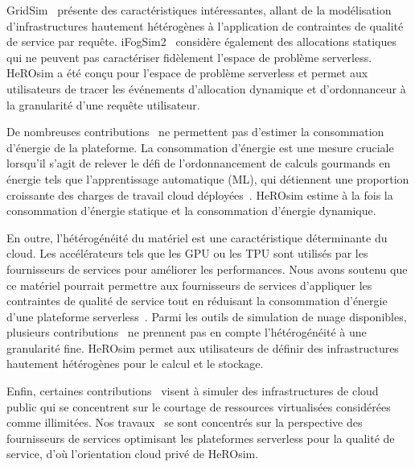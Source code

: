 GridSim~\cite{buyyaGridSimToolkitModeling2002} présente des caractéristiques intéressantes, allant de la modélisation d'infrastructures hautement hétérogènes à l'application de contraintes de qualité de service par requête. iFogSim2~\cite{mahmudIFogSim2ExtendedIFogSim2021} considère également des allocations statiques qui ne peuvent pas caractériser fidèlement l'espace de problème serverless. HeROsim a été conçu pour l'espace de problème serverless et permet aux utilisateurs de tracer les événements d'allocation dynamique et d'ordonnanceur à la granularité d'une requête utilisateur.

De nombreuses contributions~\cite{jeonCloudSimExtensionSimulatingDistributed2019, cai_elasticsim_2017, buyyaGridSimToolkitModeling2002, nunez_icancloud_2012} ne permettent pas d'estimer la consommation d'énergie de la plateforme. La consommation d'énergie est une mesure cruciale lorsqu'il s'agit de relever le défi de l'ordonnancement de calculs gourmands en énergie tels que l'apprentissage automatique (ML), qui détiennent une proportion croissante des charges de travail cloud déployées~\cite{masanet2020recalibrating}. 
HeROsim estime à la fois la consommation d'énergie statique et la consommation d'énergie dynamique.

En outre, l'hétérogénéité du matériel est une caractéristique déterminante du cloud. Les accélérateurs tels que les GPU ou les TPU sont utilisés par les fournisseurs de services pour améliorer les performances. Nous avons soutenu que ce matériel pourrait permettre aux fournisseurs de services d'appliquer les contraintes de qualité de service tout en réduisant la consommation d'énergie d'une plateforme serverless~\cite{herofake}.
Parmi les outils de simulation de nuage disponibles, plusieurs contributions~\cite{jeonCloudSimExtensionSimulatingDistributed2019, cai_elasticsim_2017, nunez_icancloud_2012, mahmoudiSimFaaSPerformanceSimulator2021} ne prennent pas en compte l'hétérogénéité à une granularité fine. HeROsim permet aux utilisateurs de définir des infrastructures hautement hétérogènes pour le calcul et le stockage.

Enfin, certaines contributions~\cite{nunez_icancloud_2012, mahmoudiSimFaaSPerformanceSimulator2021} visent à simuler des infrastructures de cloud public qui se concentrent sur le courtage de ressources virtualisées considérées comme illimitées. Nos travaux~\cite{herofake, herocache} se sont concentrés sur la perspective des fournisseurs de services optimisant les plateformes serverless pour la qualité de service, d'où l'orientation cloud privé de HeROsim.


